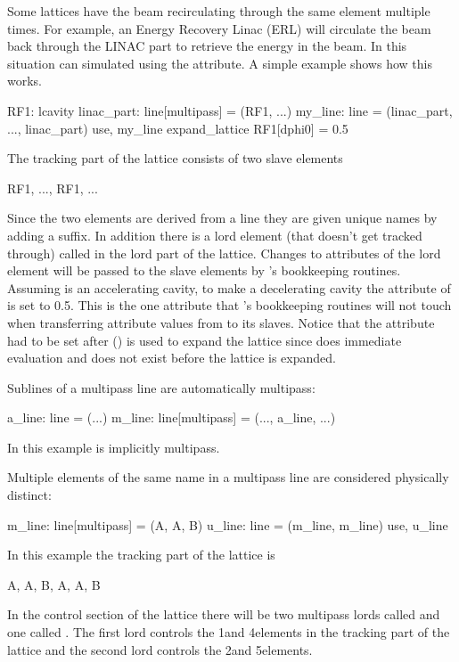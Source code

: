 Some lattices have the beam recirculating through the same element
multiple times. For example, an Energy Recovery Linac (ERL) will
circulate the beam back through the LINAC part to retrieve the energy
in the beam. In \bmad this situation can simulated using the
 attribute. A simple example shows how this works.
\begin{example}
  RF1: lcavity
  linac_part: line[multipass] = (RF1, ...)
  my_line: line = (linac_part, ..., linac_part)
  use, my_line
  expand_lattice
  RF1[dphi0] = 0.5
\end{example}
The tracking part of the lattice consists of two slave elements
\begin{example}
  RF1, ..., RF1, ...
\end{example}
Since the two elements are derived from a  line they are
given unique names by adding a  suffix. In addition there is
a lord element (that doesn't get tracked through) called  in the
lord part of the lattice. Changes to attributes of the lord 
element will be passed to the slave elements by \bmad's bookkeeping
routines. Assuming  is an accelerating cavity, to make
 a decelerating cavity the  attribute of
 is set to 0.5. This is the one attribute that \bmad's
bookkeeping routines will not touch when transferring attribute values
from  to its slaves. Notice that the  attribute had to
be set after  ()
is used to expand the lattice since
\bmad does immediate evaluation and  does not exist before
the lattice is expanded.

Sublines of a multipass line are automatically multipass:
\begin{example}
  a_line: line = (...)
  m_line: line[multipass] = (..., a_line, ...)
\end{example}
In this example  is implicitly multipass.

Multiple elements of the same name in a multipass line are considered 
physically distinct:
\begin{example}
  m_line: line[multipass] = (A, A, B)
  u_line: line = (m_line, m_line)
  use, u_line
\end{example}
In this example the tracking part of the lattice is
\begin{example}
  A, A, B, A, A, B
\end{example}
In the control section of the lattice there will be two multipass
lords called  and one called . The first  lord 
controls the 1\St and 4\Th elements in the tracking part of the lattice 
and the second  lord controls the 2\Nd and 5\Th elements.

